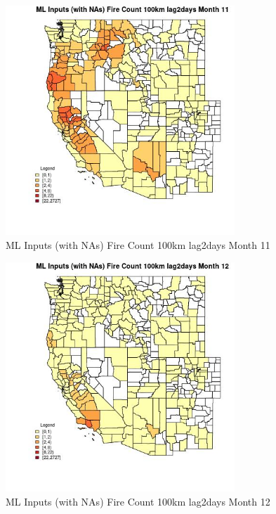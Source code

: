 \clearpage 

\begin{figure} 
\centering  
\includegraphics[width=0.77\textwidth]{Code_Outputs/Report_ML_input_PM25_Step4_part_f_de_duplicated_aves_prioritize_24hr_obswNAs_CountyFire_Count_100km_lag2daysmedianMonth11.jpg} 
\caption{\label{fig:Report_ML_input_PM25_Step4_part_f_de_duplicated_aves_prioritize_24hr_obswNAsCountyFire_Count_100km_lag2daysmedianMonth11}ML Inputs (with NAs) Fire Count 100km lag2days Month 11} 
\end{figure} 
 

\begin{figure} 
\centering  
\includegraphics[width=0.77\textwidth]{Code_Outputs/Report_ML_input_PM25_Step4_part_f_de_duplicated_aves_prioritize_24hr_obswNAs_CountyFire_Count_100km_lag2daysmedianMonth12.jpg} 
\caption{\label{fig:Report_ML_input_PM25_Step4_part_f_de_duplicated_aves_prioritize_24hr_obswNAsCountyFire_Count_100km_lag2daysmedianMonth12}ML Inputs (with NAs) Fire Count 100km lag2days Month 12} 
\end{figure} 
 

